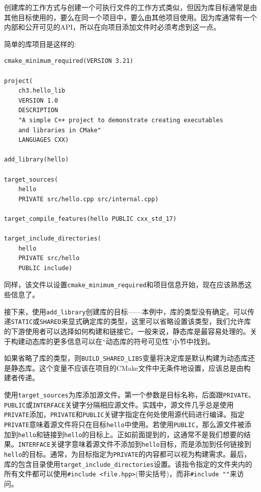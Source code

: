 
创建库的工作方式与创建一个可执行文件的工作方式类似，但因为库目标通常是由其他目标使用的，要么在同一个项目中，要么由其他项目使用。因为库通常有一个内部和公开可见的API，所以在向项目添加文件时必须考虑到这一点。

简单的库项目是这样的:

\begin{lstlisting}[style=styleCMake]
cmake_minimum_required(VERSION 3.21)

project(
	ch3.hello_lib
	VERSION 1.0
	DESCRIPTION
	"A simple C++ project to demonstrate creating executables
	and libraries in CMake"
	LANGUAGES CXX)
	
add_library(hello)

target_sources(
	hello
	PRIVATE src/hello.cpp src/internal.cpp)
	
target_compile_features(hello PUBLIC cxx_std_17)

target_include_directories(
	hello
	PRIVATE src/hello
	PUBLIC include)
\end{lstlisting}

同样，该文件以设置\texttt{cmake\_minimum\_required}和项目信息开始，现在应该熟悉这些信息了。

接下来，使用\texttt{add\_library}创建库的目标——本例中，库的类型没有确定。可以传递\texttt{STATIC}或\texttt{SHARED}来显式确定库的类型，这里可以省略设置该类型，我们允许库的下游使用者可以选择如何构建和链接它。一般来说，静态库是最容易处理的。关于构建动态库的更多信息可以在“动态库的符号可见性”小节中找到。

如果省略了库的类型，则\texttt{BUILD\_SHARED\_LIBS}变量将决定库是默认构建为动态库还是静态库。这个变量不应该在项目的CMake文件中无条件地设置，应该总是由构建者传递。

使用\texttt{target\_sources}为库添加源文件。第一个参数是目标名称，后面跟\texttt{PRIVATE}、\texttt{PUBLIC}或\texttt{INTERFACE}关键字分隔相应源文件。实践中，源文件几乎总是使用\texttt{PRIVATE}添加，\texttt{PRIVATE}和\texttt{PUBLIC}关键字指定在何处使用源代码进行编译。指定\texttt{PRIVATE}意味着源文件将只在目标\texttt{hello}中使用。若使用\texttt{PUBLIC}，那么源文件被添加到\texttt{hello}和链接到\texttt{hello}的目标上。正如前面提到的，这通常不是我们想要的结果。\texttt{INTERFACE}关键字意味着源文件不添加到\texttt{hello}目标，而是添加到任何链接到\texttt{hello}的目标。通常，为目标指定为\texttt{PRIVATE}的内容都可以视为构建需求。最后，库的包含目录使用\texttt{target\_include\_directories}设置。该指令指定的文件夹内的所有文件都可以使用\texttt{\#include <file.hpp>}(带尖括号)，而非\texttt{\#include ""}来访问。

